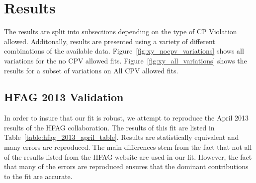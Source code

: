 \section{Results}
\label{sec:Results}
The results are split into subsections depending on the type of CP Violation allowed.
Additonally, results are presented using a variety of different combinations of the
available data. Figure~\ref{fig:xy_nocpv_variations} shows all variations for the 
no CPV allowed fits. Figure~\ref{fig:xy_all_variations} shows the results for a 
subset of variations on All CPV allowed fits. 
\subsection{HFAG 2013 Validation}
In order to insure that our fit is robust, we attempt to reproduce the April 2013 results
of the HFAG collaboration\cite{HFAG}. The results of this fit are listed in Table~\ref{table:hfag_2013_april_table}.
Results are statistically equivalent and many errors are reproduced. The main differences 
stem from the fact that not all of the results listed from the HFAG website\cite{HFAG} are 
used in our fit. However, the fact that many of the errors are reproduced ensures that 
the dominant contributions to the fit are accurate.

